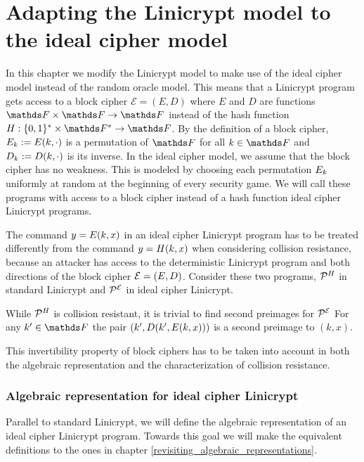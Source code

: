 \chapter{Adapting the Linicrypt model to the ideal cipher model}

In this chapter we modify the Linicrypt model to make use of the ideal cipher model instead of the random oracle model.
This means that a Linicrypt program gets access to a block cipher $\mathcal{E} = (E, D)$ where $E$ and $D$ are functions $\F \times \F \to \F$
instead of the hash function $\H : \{0,1\}^* \times \F^* \to \F$.
By the definition of a block cipher,
$E_k := E(k, \cdot)$ is a permutation of $\F$ for all $k \in \F$ and
$D_k := D(k, \cdot)$ is its inverse.
In the ideal cipher model, we assume that the block cipher has no weakness.
This is modeled by choosing each permutation $E_k$ uniformly at random at the beginning of every security game.
We will call these programs with access to a block cipher instead of a hash function ideal cipher Linicrypt programs.

The command $y = E(k, x)$ in an ideal cipher Linicrypt program has to be treated differently from the command $y = H(k, x)$ when considering collision resistance,
because an attacker has access to the deterministic Linicrypt program and both directions of the block cipher $\mathcal{E} = (E, D)$.
Consider these two programs, $\mathcal{P}^H_{\mathsf{}}$ in standard Linicrypt and $\mathcal{P}^{\mathcal{E}}_{\mathsf{}}$ in ideal cipher Linicrypt.

\begin{pchstack}[center,space=2cm]
\end{pchstack}
While $\mathcal{P}^H_{\mathsf{}}$ is collision resistant, it is trivial to find second preimages for $\mathcal{P}^{\mathcal{E}}_{\mathsf{}}$
For any $k' \in \F$ the pair $(k', D(k', E(k, x)))$ is a second preimage to $(k,x)$.

This invertibility property of block ciphers has to be taken into account
in both the algebraic representation and the characterization of collision resistance.

\subsection{Algebraic representation for ideal cipher Linicrypt}

Parallel to standard Linicrypt, we will define the algebraic representation of an ideal cipher Linicrypt program.
Towards this goal we will make the equivalent definitions to the ones in chapter \ref{revisiting_algebraic_representations}.

